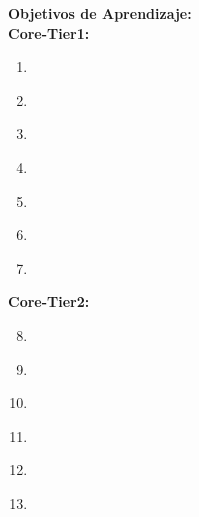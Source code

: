 \noindent \textbf{Objetivos de Aprendizaje:}\\
\noindent \textbf{Core-Tier1:}
\begin{enumerate}
	\setcounter{enumi}{0}
	\item \IASPrinciplesofSecureDesignLODescribeTheLeast\xspace[\IASPrinciplesofSecureDesignLODescribeTheLeastLevel]\label{sec:BOK:IASPrinciplesofSecureDesignLODescribeTheLeast}
	\item \IASPrinciplesofSecureDesignLOSummarizeTheFail\xspace[\IASPrinciplesofSecureDesignLOSummarizeTheFailLevel]\label{sec:BOK:IASPrinciplesofSecureDesignLOSummarizeTheFail}
	\item \IASPrinciplesofSecureDesignLODiscussTheRelying\xspace[\IASPrinciplesofSecureDesignLODiscussTheRelyingLevel]\label{sec:BOK:IASPrinciplesofSecureDesignLODiscussTheRelying}
	\item \IASPrinciplesofSecureDesignLOExplainTheEnd\xspace[\IASPrinciplesofSecureDesignLOExplainTheEndLevel]\label{sec:BOK:IASPrinciplesofSecureDesignLOExplainTheEnd}
	\item \IASPrinciplesofSecureDesignLODiscussTheHaving\xspace[\IASPrinciplesofSecureDesignLODiscussTheHavingLevel]\label{sec:BOK:IASPrinciplesofSecureDesignLODiscussTheHaving}
	\item \IASPrinciplesofSecureDesignLOForEach\xspace[\IASPrinciplesofSecureDesignLOForEachLevel]\label{sec:BOK:IASPrinciplesofSecureDesignLOForEach}
	\item \IASPrinciplesofSecureDesignLODescribeTheTradeoffs\xspace[\IASPrinciplesofSecureDesignLODescribeTheTradeoffsLevel]\label{sec:BOK:IASPrinciplesofSecureDesignLODescribeTheTradeoffs}
\end{enumerate}
\noindent \textbf{Core-Tier2:}
\begin{enumerate}
	\setcounter{enumi}{7}
	\item \IASPrinciplesofSecureDesignLODescribeTheMediation\xspace[\IASPrinciplesofSecureDesignLODescribeTheMediationLevel]\label{sec:BOK:IASPrinciplesofSecureDesignLODescribeTheMediation}
	\item \IASPrinciplesofSecureDesignLOBeAware\xspace[\IASPrinciplesofSecureDesignLOBeAwareLevel]\label{sec:BOK:IASPrinciplesofSecureDesignLOBeAware}
	\item \IASPrinciplesofSecureDesignLOExplainTheTrusted\xspace[\IASPrinciplesofSecureDesignLOExplainTheTrustedLevel]\label{sec:BOK:IASPrinciplesofSecureDesignLOExplainTheTrusted}
	\item \IASPrinciplesofSecureDesignLODiscussTheUsability\xspace[\IASPrinciplesofSecureDesignLODiscussTheUsabilityLevel]\label{sec:BOK:IASPrinciplesofSecureDesignLODiscussTheUsability}
	\item \IASPrinciplesofSecureDesignLODescribeSecurity\xspace[\IASPrinciplesofSecureDesignLODescribeSecurityLevel]\label{sec:BOK:IASPrinciplesofSecureDesignLODescribeSecurity}
	\item \IASPrinciplesofSecureDesignLOIdentifyTheOf\xspace[\IASPrinciplesofSecureDesignLOIdentifyTheOfLevel]\label{sec:BOK:IASPrinciplesofSecureDesignLOIdentifyTheOf}
\end{enumerate}


